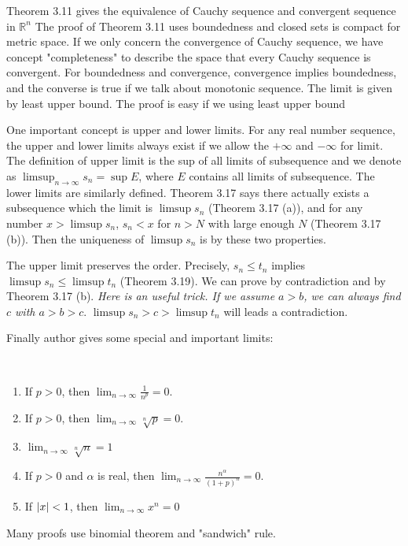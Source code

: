 Theorem 3.11 gives the equivalence of Cauchy sequence and convergent sequence in $\mathbb{R}^n$ The proof of Theorem 3.11 uses boundedness and closed sets is compact for metric space. If we only concern the convergence of Cauchy sequence, we have concept "completeness" to describe the space that every Cauchy sequence is convergent. For boundedness and convergence, convergence implies boundedness, and the converse is true if we talk about monotonic sequence. The limit is given by least upper bound. The proof is easy if we using least upper bound\par
One important concept is upper and lower limits. For any real number sequence, the upper and lower limits always exist if we allow the $+\infty$ and $-\infty$ for limit. The definition of upper limit is the sup of all limits of subsequence and we denote as $\limsup_{n\to \infty}s_n=\sup E$, where $E$ contains all limits of subsequence. The lower limits are similarly defined. Theorem 3.17 says there actually exists a subsequence which the limit is $\limsup s_n$ (Theorem 3.17 (a)), and for any number $x>\limsup s_n$, $s_n<x$ for $n>N$ with large enough $N$ (Theorem 3.17 (b)). Then the uniqueness of $\limsup s_n$ is by these two properties.\par
The upper limit preserves the order. Precisely, $s_n\leq t_n$ implies $\limsup s_n\leq \limsup t_n$ (Theorem 3.19). We can prove by contradiction and by Theorem 3.17 (b). \emph{Here is an useful trick. If we assume $a>b$, we can always find $c$ with $a>b>c$}. $\limsup s_n>c> \limsup t_n$ will leads a contradiction.\par
Finally author gives some special and important limits:
\begin{theorem}[Theorem 3.20]\ \par
    \begin{enumerate}
        \item If $p>0$, then $\lim_{n\to \infty}\frac{1}{n^p}=0$.
        \item If $p>0$, then $\lim_{n\to \infty}\sqrt[n]{p}=0$.
        \item $\lim_{n\to \infty}\sqrt[n]{n}=1$
        \item If $p>0$ and $\alpha$ is real, then $\lim_{n\to \infty}\frac{n^\alpha}{(1+p)^n}=0$.
        \item If $\left\lvert x\right\rvert<1$, then $\lim_{n\to \infty}x^n=0$
    \end{enumerate}
\end{theorem}
 Many proofs use binomial theorem and "sandwich" rule.
